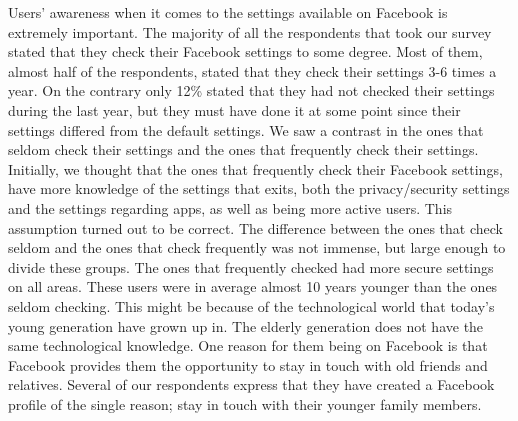 Users' awareness when it comes to the settings available on Facebook is extremely important. The majority of all the respondents that took our survey stated that they check their Facebook settings to some degree. Most of them, almost half of the respondents, stated that they check their settings 3-6 times a year. On the contrary only 12\% stated that they had not checked their settings during the last year, but they must have done it at some point since their settings differed from the default settings. We saw a contrast in the ones that seldom check their settings and the ones that frequently check their settings. Initially, we 
thought that the ones that frequently check their Facebook settings, have more knowledge of the settings that exits, both the privacy/security settings and the settings regarding apps, as well as being more active users. This assumption turned out to be correct. The difference between the ones that check seldom and the ones that check frequently was not immense, but large enough to divide these groups. The ones that frequently checked had more secure settings on all areas. These users were in average almost 10 years younger than the ones seldom checking. This might be because of the technological world that today's young generation have grown up in. The elderly generation does not have the same technological knowledge. One reason for them being on Facebook is that Facebook provides them the opportunity to stay in touch with old friends and relatives. Several of our respondents express that they have created a Facebook profile of the single reason; stay in touch with their younger family members. 

